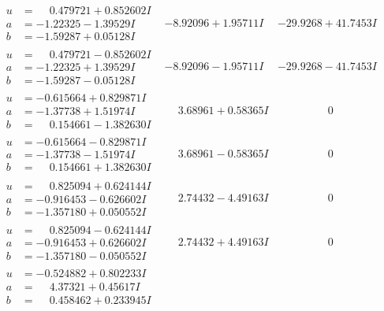 \documentclass[1p]{elsarticle_modified}
\theoremstyle{definition}
\begin{document}
$$\begin{array}{c|c|c}
 \hline 
\begin{aligned}
u &= \phantom{-}0.479721 + 0.852602 I \\
a &= -1.22325 - 1.39529 I \\
b &= -1.59287 + 0.05128 I\end{aligned}
 & -8.92096 + 1.95711 I & -29.9268 + 41.7453 I \\ \hline\begin{aligned}
u &= \phantom{-}0.479721 - 0.852602 I \\
a &= -1.22325 + 1.39529 I \\
b &= -1.59287 - 0.05128 I\end{aligned}
 & -8.92096 - 1.95711 I & -29.9268 - 41.7453 I \\ \hline\begin{aligned}
u &= -0.615664 + 0.829871 I \\
a &= -1.37738 + 1.51974 I \\
b &= \phantom{-}0.154661 - 1.382630 I\end{aligned}
 & \phantom{-}3.68961 + 0.58365 I & \phantom{-0.000000 } 0 \\ \hline\begin{aligned}
u &= -0.615664 - 0.829871 I \\
a &= -1.37738 - 1.51974 I \\
b &= \phantom{-}0.154661 + 1.382630 I\end{aligned}
 & \phantom{-}3.68961 - 0.58365 I & \phantom{-0.000000 } 0 \\ \hline\begin{aligned}
u &= \phantom{-}0.825094 + 0.624144 I \\
a &= -0.916453 - 0.626602 I \\
b &= -1.357180 + 0.050552 I\end{aligned}
 & \phantom{-}2.74432 - 4.49163 I & \phantom{-0.000000 } 0 \\ \hline\begin{aligned}
u &= \phantom{-}0.825094 - 0.624144 I \\
a &= -0.916453 + 0.626602 I \\
b &= -1.357180 - 0.050552 I\end{aligned}
 & \phantom{-}2.74432 + 4.49163 I & \phantom{-0.000000 } 0 \\ \hline\begin{aligned}
u &= -0.524882 + 0.802233 I \\
a &= \phantom{-}4.37321 + 0.45617 I \\
b &= \phantom{-}0.458462 + 0.233945 I\end{aligned}

\end{array}$$
\end{document}
